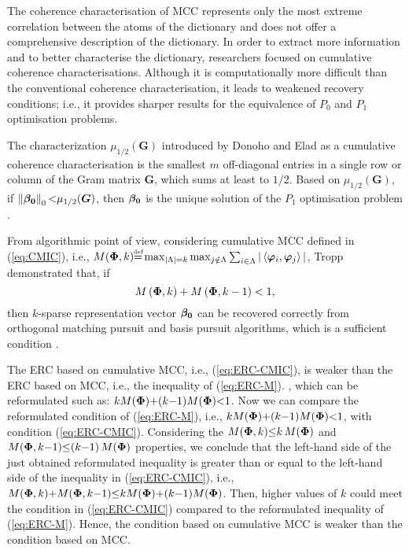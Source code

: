 The coherence characterisation of MCC \cite{Donoho2001} 
represents only the most extreme correlation between the atoms of the dictionary and does not offer a comprehensive description of the dictionary. 
In order to extract more information and to better characterise the dictionary, researchers focused on cumulative coherence characterisations. 
Although it is computationally more difficult than the conventional coherence characterisation, it leads to weakened recovery conditions; i.e., it provides sharper results for the equivalence of $P_0$ and $P_1$ optimisation problems. 

The characterization $\mu_{1/2}(\boldsymbol{G})$ introduced by Donoho and Elad as a cumulative coherence characterisation is the smallest $m$ off-diagonal entries in a single row or column of the Gram matrix $\boldsymbol{G}$, which sums at least to $1/2$.
Based on $\mu_{1/2}(\boldsymbol{G})$, if $\left\lVert\boldsymbol{\beta_0}\right\rVert_0 {<} \mu_{1/2}(\boldsymbol{G})$, then $\boldsymbol{\beta_0}$ is the unique solution of the $P_1$ optimisation problem \cite{Donoho2003}.

From algorithmic point of view, considering cumulative MCC defined in (\ref{eq:CMIC}), i.e., $M(\myPhi , k) {\myeq} 
\max_{\myabs{\Lambda}=k} \max_{j \notin \Lambda}
\sum_{i \in \Lambda} | \left\langle \boldsymbol{\varphi}_i , \boldsymbol{\varphi}_{j} \right\rangle |$, Tropp demonstrated that, if 
\begin{equation}
\label{eq:ERC-CMIC}
M\left( \boldsymbol{\Phi} , k \right)+M\left( \boldsymbol{\Phi} , k-1 \right) < 1, 
\end{equation}
then $k$-sparse representation vector $\boldsymbol{\beta_0}$ can be recovered correctly from orthogonal matching pursuit and basis pursuit algorithms, which is a sufficient condition \cite{Tropp2004}.

The ERC based on cumulative MCC, i.e., (\ref{eq:ERC-CMIC}), is weaker than the ERC based on MCC, i.e., the inequality of (\ref{eq:ERC-M}).
, which can be reformulated such as: $kM(\boldsymbol{\Phi}) {+} (k {-} 1)M(\boldsymbol{\Phi}) {<} 1$.
Now we can compare the reformulated condition of (\ref{eq:ERC-M}), i.e., $kM(\boldsymbol{\Phi}) {+} (k {-} 1)M(\boldsymbol{\Phi}) {<} 1$, with condition (\ref{eq:ERC-CMIC}).
Considering the $M(\boldsymbol{\Phi} , k) {\leq} k \, M(\boldsymbol{\Phi})$ and $M(\boldsymbol{\Phi} , k {-} 1) {\leq} (k {-} 1) \, M(\boldsymbol{\Phi})$ properties, we conclude that the left-hand side  of the just obtained reformulated inequality is greater than or equal to the left-hand side of the inequality in (\ref{eq:ERC-CMIC}), i.e., $M(\boldsymbol{\Phi} , k) {+} M(\boldsymbol{\Phi} , k {-} 1) {\leq} kM(\boldsymbol{\Phi}) {+} (k {-} 1)M(\boldsymbol{\Phi})$.
Then, higher values of $k$ could meet the condition in (\ref{eq:ERC-CMIC}) compared to the reformulated inequality of (\ref{eq:ERC-M}).
Hence, the condition based on cumulative MCC is weaker than the condition based on MCC.

